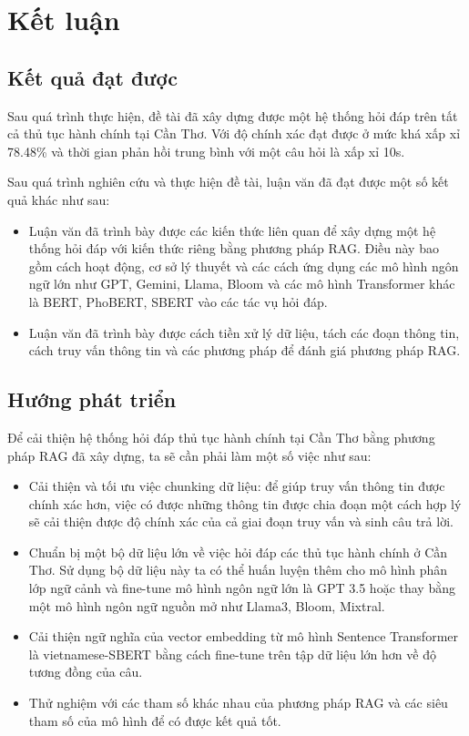 \documentclass[a4paper, 12pt, openany]{book}
\begin{document}
\chapter{Kết luận}
\section{Kết quả đạt được}

Sau quá trình thực hiện, đề tài đã xây dựng được một hệ thống hỏi đáp trên tất cả thủ tục hành chính tại Cần Thơ.
Với độ chính xác đạt được ở mức khá xấp xỉ 78.48\% và thời gian phản hồi trung bình với một câu hỏi là xấp xỉ 10s.

Sau quá trình nghiên cứu và thực hiện đề tài, luận văn đã đạt được một số kết quả khác như sau:

\begin{itemize}
    \item Luận văn đã trình bày được các kiến thức liên quan để xây dựng một hệ thống hỏi đáp với kiến thức riêng bằng phương pháp RAG.
    Điều này bao gồm cách hoạt động, cơ sở lý thuyết và các cách ứng dụng các mô hình ngôn ngữ lớn như GPT, Gemini, Llama, Bloom và các mô hình
    Transformer khác là BERT, PhoBERT, SBERT vào các tác vụ hỏi đáp.
    \item Luận văn đã trình bày được cách tiền xử lý dữ liệu, tách các đoạn thông tin, cách truy vấn thông tin và 
    các phương pháp để đánh giá phương pháp RAG.
\end{itemize}

\section{Hướng phát triển}

Để cải thiện hệ thống hỏi đáp thủ tục hành chính tại Cần Thơ bằng phương pháp RAG đã xây dựng, ta 
sẽ cần phải làm một số việc như sau:

\begin{itemize}
    \item Cải thiện và tối ưu việc chunking dữ liệu: để giúp truy vấn thông tin được chính xác hơn, việc có được những thông tin được chia đoạn một cách hợp lý
    sẽ cải thiện được độ chính xác của cả giai đoạn truy vấn và sinh câu trả lời.
    
    \item Chuẩn bị một bộ dữ liệu lớn về việc hỏi đáp các thủ tục hành chính ở Cần Thơ. Sử dụng bộ dữ liệu này
    ta có thể huấn luyện thêm cho mô hình phân lớp ngữ cảnh và fine-tune mô hình ngôn ngữ lớn là GPT 3.5 hoặc thay bằng một mô hình ngôn ngữ nguồn mở như Llama3, Bloom, Mixtral.

    \item Cải thiện ngữ nghĩa của vector embedding từ mô hình Sentence Transformer là vietnamese-SBERT bằng cách fine-tune trên tập dữ liệu lớn hơn về độ tương đồng của câu.

    \item Thử nghiệm với các tham số khác nhau của phương pháp RAG và các siêu tham số của mô hình để có được kết quả tốt.
\end{itemize}
\end{document}
